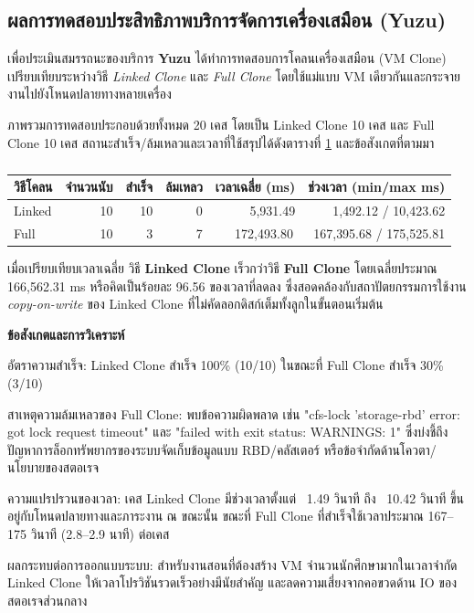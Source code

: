 \subsection{ผลการทดสอบประสิทธิภาพบริการจัดการเครื่องเสมือน (Yuzu)}
\label{sec:yuzu-perf}
\hspace*{1.5em}
เพื่อประเมินสมรรถนะของบริการ \textbf{Yuzu} ได้ทำการทดสอบการโคลนเครื่องเสมือน (VM Clone) เปรียบเทียบระหว่างวิธี \textit{Linked Clone} และ \textit{Full Clone} โดยใช้แม่แบบ VM เดียวกันและกระจายงานไปยังโหนดปลายทางหลายเครื่อง

\hspace*{1.5em}
ภาพรวมการทดสอบประกอบด้วยทั้งหมด 20 เคส โดยเป็น Linked Clone 10 เคส และ Full Clone 10 เคส สถานะสำเร็จ/ล้มเหลวและเวลาที่ใช้สรุปได้ดังตารางที่ \ref{tab:yuzu-clone-summary} และข้อสังเกตที่ตามมา

\begin{table}[htbp]
    \centering
    \caption{}
    \label{tab:yuzu-clone-summary}
    \begin{tabular}{lrrrrr}
        \hline
        วิธีโคลน & จำนวนนับ & สำเร็จ & ล้มเหลว & เวลาเฉลี่ย (ms) & ช่วงเวลา (min/max ms) \\
        \hline
        Linked & 10 & 10 & 0 & 5{,}931.49 & 1{,}492.12 / 10{,}423.62 \\
        Full & 10 & 3 & 7 & 172{,}493.80\,\footnotemark & 167{,}395.68 / 175{,}525.81 \\
        \hline
    \end{tabular}
\end{table}

\hspace*{1.5em}
เมื่อเปรียบเทียบเวลาเฉลี่ย วิธี \textbf{Linked Clone} เร็วกว่าวิธี \textbf{Full Clone} โดยเฉลี่ยประมาณ 166{,}562.31 ms หรือคิดเป็นร้อยละ 96.56 ของเวลาที่ลดลง ซึ่งสอดคล้องกับสถาปัตยกรรมการใช้งาน \textit{copy-on-write} ของ Linked Clone ที่ไม่คัดลอกดิสก์เต็มทั้งลูกในขั้นตอนเริ่มต้น

\hspace*{1.5em}
\textbf{ข้อสังเกตและการวิเคราะห์}
\begin{mycustomitem}
    \item อัตราความสำเร็จ: Linked Clone สําเร็จ 100\% (10/10) ในขณะที่ Full Clone สําเร็จ 30\% (3/10)
    \item สาเหตุความล้มเหลวของ Full Clone: พบข้อความผิดพลาด เช่น "cfs-lock 'storage-rbd' error: got lock request timeout" และ "failed with exit status: WARNINGS: 1" ซึ่งบ่งชี้ถึงปัญหาการล็อกทรัพยากรของระบบจัดเก็บข้อมูลแบบ RBD/คลัสเตอร์ หรือข้อจํากัดด้านโควตา/นโยบายของสตอเรจ
    \item ความแปรปรวนของเวลา: เคส Linked Clone มีช่วงเวลาตั้งแต่ ~1.49 วินาที ถึง ~10.42 วินาที ขึ้นอยู่กับโหนดปลายทางและภาระงาน ณ ขณะนั้น ขณะที่ Full Clone ที่สําเร็จใช้เวลาประมาณ 167–175 วินาที (2.8–2.9 นาที) ต่อเคส
    \item ผลกระทบต่อการออกแบบระบบ: สำหรับงานสอนที่ต้องสร้าง VM จำนวนนักศึกษามากในเวลาจำกัด Linked Clone ให้เวลาโปรวิชันรวดเร็วอย่างมีนัยสําคัญ และลดความเสี่ยงจากคอขวดด้าน IO ของสตอเรจส่วนกลาง
\end{mycustomitem}

